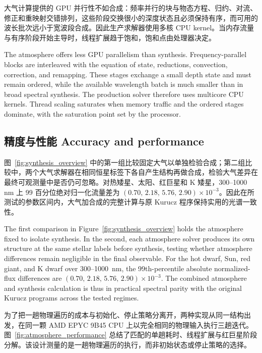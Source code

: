 大气计算提供的 GPU 并行性不如合成：频率并行的块与物态方程、归约、对流、修正和重映射交错排列，这些阶段交换很小的深度状态且必须保持有序，而可用的波长批次远小于宽波段合成。因此生产求解器使用多核 CPU kernel。当内存流量与有序阶段开始主导时，线程扩展趋于饱和，饱和点由处理器决定。

\begin{EN}
The atmosphere offers less GPU parallelism than synthesis. Frequency-parallel
blocks are interleaved with the equation of state, reductions, convection,
correction, and remapping. These stages exchange a small depth state and must
remain ordered, while the available wavelength batch is much smaller than in
broad spectral synthesis. The production solver therefore uses multicore CPU
kernels. Thread scaling saturates when memory traffic and the ordered stages
dominate, with the saturation point set by the processor.
\end{EN}

\subsection{精度与性能 Accuracy and performance}

图~\ref{fig:synthesis_overview} 中的第一组比较固定大气以单独检验合成；第二组比较中，两个大气求解器在相同恒星标签下各自产生结构再做合成，检验大气差异在最终可观测量中是否仍可忽略。对热矮星、太阳、红巨星和 K 矮星，300--1000 nm 上 99 百分位绝对归一化流量差为 $(0.70,\,2.18,\,5.76,\,2.90)\times10^{-3}$。因此在所测试的参数区间内，大气加合成的完整计算与原 Kurucz 程序保持实用的光谱一致性。

\begin{EN}
The first comparison in Figure~\ref{fig:synthesis_overview} holds the atmosphere
fixed to isolate synthesis. In the second, each atmosphere solver produces its
own structure at the same stellar labels before synthesis, testing whether
atmosphere differences remain negligible in the final observable. For the hot
dwarf, Sun, red giant, and K dwarf over 300--1000~nm,
the 99th-percentile absolute normalized-flux differences are
$(0.70,\,2.18,\,5.76,\,2.90)\times10^{-3}$. The combined atmosphere and synthesis
calculation is thus in practical spectral parity with the original Kurucz
programs across the tested regimes.
\end{EN}

为了把一趟物理遍历的成本与初始化、停止策略分离开，两种实现从同一结构出发，在同一颗 AMD EPYC 9B45 CPU 上以完全相同的物理输入执行三趟迭代。图~\ref{fig:atmosphere_performance} 总结了匹配的单趟耗时、线程扩展与红巨星阶段分解。该设计测量的是一趟物理遍历的执行，而非初始状态或停止策略的选择。

